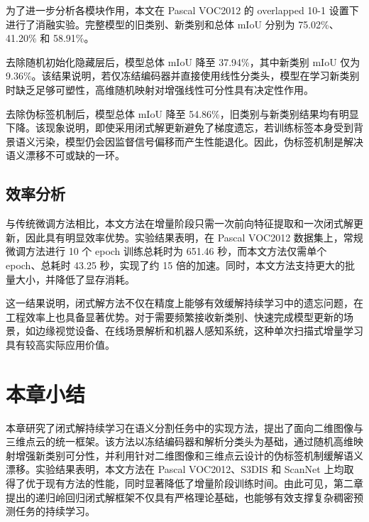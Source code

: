 为了进一步分析各模块作用，本文在 Pascal VOC2012 的 overlapped 10-1 设置下进行了消融实验。完整模型的旧类别、新类别和总体 mIoU 分别为 75.02\%、41.20\% 和 58.91\%。

去除随机初始化隐藏层后，模型总体 mIoU 降至 37.94\%，其中新类别 mIoU 仅为 9.36\%。该结果说明，若仅冻结编码器并直接使用线性分类头，模型在学习新类别时缺乏足够可塑性，高维随机映射对增强线性可分性具有决定性作用。

去除伪标签机制后，模型总体 mIoU 降至 54.86\%，旧类别与新类别结果均有明显下降。该现象说明，即使采用闭式解更新避免了梯度遗忘，若训练标签本身受到背景语义污染，模型仍会因监督信号偏移而产生性能退化。因此，伪标签机制是解决语义漂移不可或缺的一环。

\subsection{效率分析}


\begin{table}[htbp]
\caption{训练时间与 GPU 显存消耗对比，微调方法在 Pascal VOC2012 数据集上训练 10 个 epoch。}

\centering
\label{tab:performance_comparison}
\end{table}

与传统微调方法相比，本文方法在增量阶段只需一次前向特征提取和一次闭式解更新，因此具有明显效率优势。实验结果表明，在 Pascal VOC2012 数据集上，常规微调方法进行 10 个 epoch 训练总耗时为 651.46 秒，而本文方法仅需单个 epoch、总耗时 43.25 秒，实现了约 15 倍的加速。同时，本文方法支持更大的批量大小，并降低了显存消耗。

这一结果说明，闭式解方法不仅在精度上能够有效缓解持续学习中的遗忘问题，在工程效率上也具备显著优势。对于需要频繁接收新类别、快速完成模型更新的场景，如边缘视觉设备、在线场景解析和机器人感知系统，这种单次扫描式增量学习具有较高实际应用价值。

\section{本章小结}

本章研究了闭式解持续学习在语义分割任务中的实现方法，提出了面向二维图像与三维点云的统一框架。该方法以冻结编码器和解析分类头为基础，通过随机高维映射增强新类别可分性，并利用针对二维图像和三维点云设计的伪标签机制缓解语义漂移。实验结果表明，本文方法在 Pascal VOC2012、S3DIS 和 ScanNet 上均取得了优于现有方法的性能，同时显著降低了增量阶段训练时间。由此可见，第二章提出的递归岭回归闭式解框架不仅具有严格理论基础，也能够有效支撑复杂稠密预测任务的持续学习。


